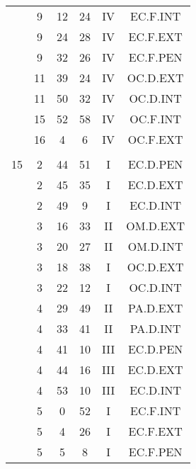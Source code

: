 \documentclass[12pt, a4paper]{article}
\begin{document}
\begin{multicols}{3}
{\begin{tabular}{c c c c c c}
	 	 	 	 & 9 & 12 & 24 & IV & EC.F.INT\\%
	 	 	 	 & 9 & 24 & 28 & IV & EC.F.EXT\\%
	 	 	 	 & 9 & 32 & 26 & IV & EC.F.PEN\\%
	 	 	 	 & 11 & 39 & 24 & IV & OC.D.EXT\\%
	 	 	 	 & 11 & 50 & 32 & IV & OC.D.INT\\%
	 	 	 	 & 15 & 52 & 58 & IV & OC.F.INT\\%
	 	 	 	 & 16 & 4 & 6 & IV & OC.F.EXT\\%
	 	 	 	 & & & & & \\%
	 	 	 	15 & 2 & 44 & 51 & I & EC.D.PEN\\%
	 	 	 	 & 2 & 45 & 35 & I & EC.D.EXT\\%
	 	 	 	 & 2 & 49 & 9 & I & EC.D.INT\\%
	 	 	 	 & 3 & 16 & 33 & II & OM.D.EXT\\%
	 	 	 	 & 3 & 20 & 27 & II & OM.D.INT\\%
	 	 	 	 & 3 & 18 & 38 & I & OC.D.EXT\\%
	 	 	 	 & 3 & 22 & 12 & I & OC.D.INT\\%
	 	 	 	 & 4 & 29 & 49 & II & PA.D.EXT\\%
	 	 	 	 & 4 & 33 & 41 & II & PA.D.INT\\%
	 	 	 	 & 4 & 41 & 10 & III & EC.D.PEN\\%
	 	 	 	 & 4 & 44 & 16 & III & EC.D.EXT\\%
	 	 	 	 & 4 & 53 & 10 & III & EC.D.INT\\%
	 	 	 	 & 5 & 0 & 52 & I & EC.F.INT\\%
	 	 	 	 & 5 & 4 & 26 & I & EC.F.EXT\\%
	 	 	 	 & 5 & 5 & 8 & I & EC.F.PEN\\%

\end{tabular}}
\end{multicols}
\end{document}
